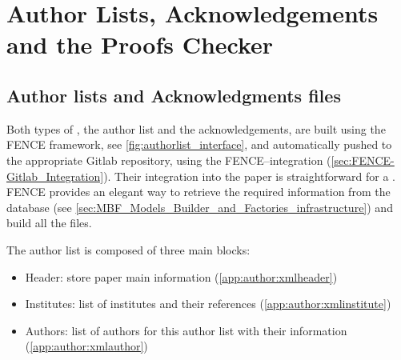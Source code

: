 
\section{Author Lists, Acknowledgements and the Proofs Checker}%
\label{sec:Authorlists_Acknowledgements_and_ProofChecker}

\subsection{Author lists and Acknowledgments files}%
\label{sec:Author_lists_and_acknowledgments_files}


Both types of , the author list and the acknowledgements, are built using the FENCE framework, see \cref{fig:authorlist_interface},
and automatically pushed to the appropriate Gitlab repository, using the FENCE--\gitlab integration (\cref{sec:FENCE-Gitlab_Integration}).
Their integration into the paper is straightforward for a .
FENCE provides an elegant way to retrieve the required information from the database (see \cref{sec:MBF_Models_Builder_and_Factories_infrastructure}) and build all the files.

The author list  is composed of three main blocks:
\begin{itemize}
\item Header: store paper main information (\cref{app:author:xmlheader})
\item Institutes: list of institutes and their references (\cref{app:author:xmlinstitute})
\item Authors: list of authors for this author list with their information (\cref{app:author:xmlauthor})
\end{itemize}

